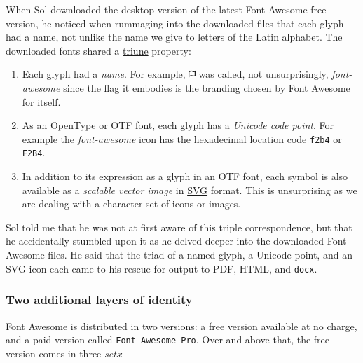 \documentclass[
  british,
  a4paper,
  rgb,
  dvipsnames,
  svgnames,
  hyphens]{article}
\begin{document}
When Sol downloaded the desktop version of the latest Font Awesome free
version, he noticed when rummaging into the downloaded files that each
glyph had a name, not unlike the name we give to letters of the Latin
alphabet. The downloaded fonts shared a
\href{https://www.collinsdictionary.com/dictionary/english/triune}{triune}
property:

\begin{enumerate}
\item
  Each glyph had a \emph{name}. For example,
  \includegraphics[width=0.02\textwidth,height=\textheight]{images/font-awesome.svg}
  was called, not unsurprisingly, \emph{font-awesome} since the flag it
  embodies is the branding chosen by Font Awesome for itself.
\item
  As an \href{https://en.wikipedia.org/wiki/OpenType}{OpenType} or OTF
  font, each glyph has a
  \href{https://en.wikipedia.org/wiki/Code_point}{\emph{Unicode code
  point}}. For example the \emph{font-awesome} icon has the
  \href{https://en.wikipedia.org/wiki/Hexadecimal}{hexadecimal} location
  code \texttt{f2b4} or \texttt{F2B4}.
\item
  In addition to its expression as a glyph in an OTF font, each symbol
  is also available as a \emph{scalable vector image} in
  \href{https://developer.mozilla.org/en-US/docs/Web/SVG}{SVG} format.
  This is unsurprising as we are dealing with a character set of icons
  or images.
\end{enumerate}

Sol told me that he was not at first aware of this triple
correspondence, but that he accidentally stumbled upon it as he delved
deeper into the downloaded Font Awesome files. He said that the triad of
a named glyph, a Unicode point, and an SVG icon each came to his rescue
for output to PDF, HTML, and \texttt{docx}.

\hypertarget{two-additional-layers-of-identity}{%
\subsubsection{Two additional layers of
identity}\label{two-additional-layers-of-identity}}

Font Awesome is distributed in two versions: a free version available at
no charge, and a paid version called \texttt{Font\ Awesome\ Pro}. Over
and above that, the free version comes in three \emph{sets}:
\end{document}
